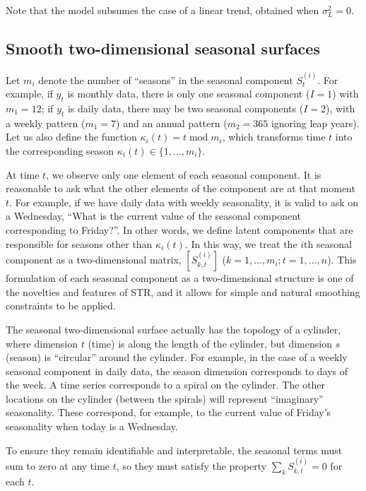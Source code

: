 \documentclass[11pt,a4paper,]{article}
\begin{document}
Note that the model subsumes the case of a linear trend, obtained when \(\sigma_L^2=0\).

\hypertarget{smooth-two-dimensional-seasonal-surfaces}{%
\subsection{Smooth two-dimensional seasonal surfaces}\label{smooth-two-dimensional-seasonal-surfaces}}

Let \(m_i\) denote the number of ``seasons'' in the seasonal component \(S^{(i)}_{t}\). For example, if \(y_t\) is monthly data, there is only one seasonal component (\(I=1\)) with \(m_1 = 12\); if \(y_t\) is daily data, there may be two seasonal components (\(I=2\)), with a weekly pattern (\(m_1=7\)) and an annual pattern (\(m_2 = 365\) ignoring leap years). Let us also define the function \(\kappa_i(t) = t\operatorname{mod}m_i\), which transforms time \(t\) into the corresponding season \(\kappa_i(t) \in \{1,\dots,m_i\}\).

At time \(t\), we observe only one element of each seasonal component. It is reasonable to ask what the other elements of the component are at that moment \(t\). For example, if we have daily data with weekly seasonality, it is valid to ask on a Wednesday, ``What is the current value of the seasonal component corresponding to Friday?''. In other words, we define latent components that are responsible for seasons other than \(\kappa_i(t)\). In this way, we treat the \(i\)th seasonal component as a two-dimensional matrix, \([S^{(i)}_{k,t}]\) (\(k=1,\dots,m_i;t=1,\dots,n\)). This formulation of each seasonal component as a two-dimensional structure is one of the novelties and features of STR, and it allows for simple and natural smoothing constraints to be applied.

The seasonal two-dimensional surface actually has the topology of a cylinder, where dimension \(t\) (time) is along the length of the cylinder, but dimension \(s\) (season) is ``circular'' around the cylinder. For example, in the case of a weekly seasonal component in daily data, the season dimension corresponds to days of the week. A time series corresponds to a spiral on the cylinder. The other locations on the cylinder (between the spirals) will represent ``imaginary'' seasonality. These correspond, for example, to the current value of Friday's seasonality when today is a Wednesday.

To ensure they remain identifiable and interpretable, the seasonal terms must sum to zero at any time \(t\), so they must satisfy the property \(\sum\limits_k S^{(i)}_{k,t} = 0\) for each \(t\).
\end{document}
